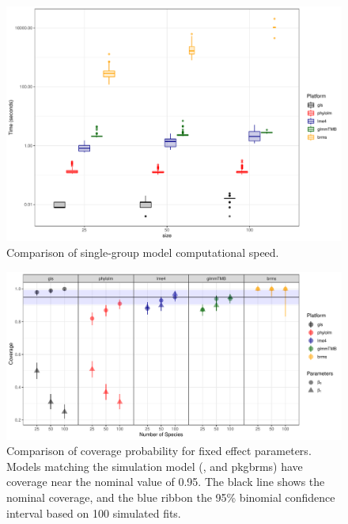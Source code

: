 \documentclass[12pt]{article}
\begin{document}
\begin{center}
\begin{figure}[H]
  \includegraphics[scale=0.7]{./figure/sstime.pdf}
  \caption{Comparison of single-group model computational speed.}
\label{ssplot_speed}
\end{figure}
\end{center}
\begin{center}
\begin{figure}[H]
  \includegraphics[scale=0.7]{./figure/sscoverage.pdf}
  \caption{Comparison of coverage probability for fixed effect parameters. Models matching the simulation model (,  and pkg{brms}) have coverage near the nominal value of 0.95. The black line shows the nominal coverage, and the blue ribbon the 95\% binomial confidence interval based on 100 simulated fits. 
  }
\label{ssplot_coverage}
\end{figure}
\end{center}
\end{document}
